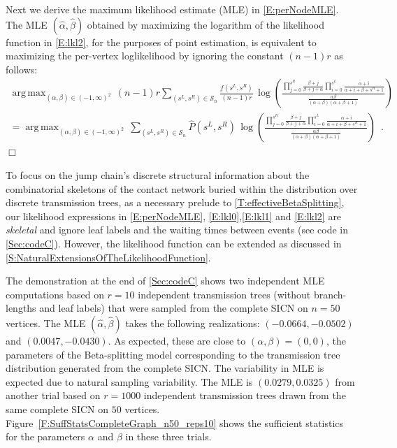 \documentclass[review]{elsarticle}
\numberwithin{equation}{section}
\let\orgautoref\autoref
\renewcommand{\autoref}
        {\def\equationautorefname{Eq.}%
         \def\figureautorefname{Fig.}%
         \def\subfigureautorefname{Fig.}%
         \def\sectionautorefname{Sect.}%
         \def\subsectionautorefname{Sect.}%
         \def\subsubsectionautorefname{Sect.}%
         \def\Itemautorefname{item}%
         \def\tableautorefname{Table}%
         \def\propositionautorefname{Prop.}%
         \def\corollaryautorefname{Corollary}%
         \def\theoremautorefname{Theorem}%
         \def\remarkautorefname{Remark}%
         \def\lemmaautorefname{Lemma}%
         \def\proofofautorefname{Proof}%
         \def\exampleautorefname{Example}%
         \orgautoref}
\providecommand{\autorefs}
        {\def\equationautorefname{Eqs.}%
         \def\figureautorefname{Figs.}%
         \def\subfigureautorefname{Figs.}%
         \def\sectionautorefname{Sects.}%
         \def\subsectionautorefname{Sects.}%
         \def\subsubsectionautorefname{Sects.}%
         \def\Itemautorefname{items}%
         \def\tableautorefname{Tables}%
         \def\propositionautorefname{Props.}%
         \def\theoremautorefname{Theorems}%
         \def\theoremautorefname{Remarks}%
         \def\lemmaautorefname{Lemmas}%
         \def\proofofautorefname{Proofs}%
         \def\exampleautorefname{Examples}%
         \orgautoref}
\DeclareMathOperator*{\argmax}{arg\,max}
\begin{document}
Next we derive the maximum likelihood estimate (MLE) in \autoref{E:perNodeMLE}.  
The MLE $(\widehat{\alpha},\widehat{\beta})$ obtained by maximizing the logarithm of the likelihood function in \autoref{E:lkl2}, for the purposes of point estimation, is equivalent to maximizing the per-vertex loglikelihood by ignoring the constant $(n-1)r$ as follows:
\begin{multline*} 
\argmax_{(\alpha,\beta) \in (-1,\infty)^2} \, 
(n-1)r \sum_{(s^L,s^R) \in \mathcal{S}_n} \frac{f(s^L,s^R)}{(n-1)r} \, \log\left(\frac{\prod_{j=0}^{s^R}\frac{\beta+j}{\beta+j+\alpha} \prod_{i=0}^{s^L} \frac{\alpha+i}{\alpha+i+\beta+s^R+1}}
{\frac{\alpha \beta}{(\alpha+\beta)(\alpha+\beta+1)}}\right) \\
= \argmax_{(\alpha,\beta) \in (-1,\infty)^2} \, 
\sum_{(s^L,s^R) \in \mathcal{S}_n} {\hat{P}(s^L,s^R)} \, \log\left(\frac{\prod_{j=0}^{s^R}\frac{\beta+j}{\beta+j+\alpha} \prod_{i=0}^{s^L} \frac{\alpha+i}{\alpha+i+\beta+s^R+1}}
{\frac{\alpha \beta}{(\alpha+\beta)(\alpha+\beta+1)}}\right) \enspace.
\end{multline*}
\hfill $\Box$

To focus on the jump chain's discrete structural information about the combinatorial skeletons of the contact network buried within the distribution over discrete transmission trees, as a necessary prelude to \autoref{T:effectiveBetaSplitting}, 
our likelihood expressions in \autorefs{E:perNodeMLE}, \ref{E:lkl0},\ref{E:lkl1} and \ref{E:lkl2} are {\em skeletal} and ignore leaf labels and the waiting times between events (see code in \autoref{Sec:codeC}).  
However, the likelihood function can be extended as discussed in \autoref{S:NaturalExtensionsOfTheLikelihoodFunction}.

The demonstration at the end of \autoref{Sec:codeC} shows two independent MLE computations based on $r=10$ independent transmission trees (without branch-lengths and leaf labels) that were sampled from the complete SICN on $n=50$ vertices.  
The MLE $(\widehat{\alpha},\widehat{\beta})$ takes the following realizations: 
$(-0.0664, -0.0502)$ and $(0.0047, -0.0430)$.  
As expected, these are close to $(\alpha,\beta)=(0,0)$, the parameters of the Beta-splitting model corresponding to the transmission tree distribution generated from the complete SICN.  
The variability in MLE is expected due to natural sampling variability.  
The MLE is $(0.0279, 0.0325)$ from another trial based on $r=1000$ independent transmission trees drawn from the same complete SICN on $50$ vertices.  
Figure~\ref{F:SuffStatsCompleteGraph_n50_reps10} shows the sufficient statistics for the parameters $\alpha$ and $\beta$ in these three trials.
\end{document}
